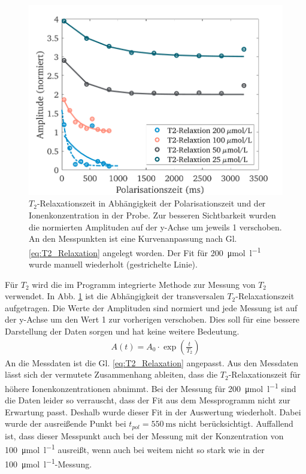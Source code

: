\documentclass[../main.tex]{subfiles}
\begin{document}
    \begin{figure}[H]
        \centering
        \includegraphics[width=\textwidth]{Bilddateien/11/T2/Part_11_Fig_5}
        \caption{$T_{2}$-Relaxationszeit in Abhängigkeit der Polarisationszeit und der Ionenkonzentration in der Probe. Zur besseren Sichtbarkeit wurden die normierten Amplituden auf der y-Achse um jeweils 1 verschoben. An den Messpunkten ist eine Kurvenanpassung nach Gl. \ref{eq:T2_Relaxation} angelegt worden. Der Fit für \SI{200}{\micro \mol \per \litre} wurde manuell wiederholt (gestrichelte Linie).}
        \label{fig:Relaxation_T2}
    \end{figure}
    Für $T_{2}$ wird die im Programm integrierte Methode zur Messung von $T_{2}$ verwendet. In Abb. \ref{fig:Relaxation_T2} ist die Abhängigkeit der transversalen $T_{2}$-Relaxationszeit aufgetragen. Die Werte der Amplituden sind normiert und jede Messung ist auf der y-Achse um den Wert 1 zur vorherigen verschoben. Dies soll für eine bessere Darstellung der Daten sorgen und hat keine weitere Bedeutung. 
    \begin{align} \label{eq:T2_Relaxation}
        A(t) = A_{0} \cdot \exp\left( \frac{t}{T_{2}}\right)
    \end{align}
    An die Messdaten ist die Gl. \ref{eq:T2_Relaxation} angepasst. Aus den Messdaten lässt sich der vermutete Zusammenhang ableiten, dass die $T_{2}$-Relaxationszeit für höhere Ionenkonzentrationen abnimmt. Bei der Messung für \SI{200}{\micro \mol \per \litre} sind die Daten leider so verrauscht, dass der Fit aus dem Messprogramm nicht zur Erwartung passt. Deshalb wurde dieser Fit in der Auswertung wiederholt. Dabei wurde der ausreißende Punkt bei $t_{pol} = \SI{550}{\milli \second}$ nicht berücksichtigt. Auffallend ist, dass dieser Messpunkt auch bei der Messung mit der Konzentration von \SI{100}{\micro \mol \per \litre} ausreißt, wenn auch bei weitem nicht so stark wie in der \SI{100}{\micro \mol \per \litre}-Messung. 
\end{document}
